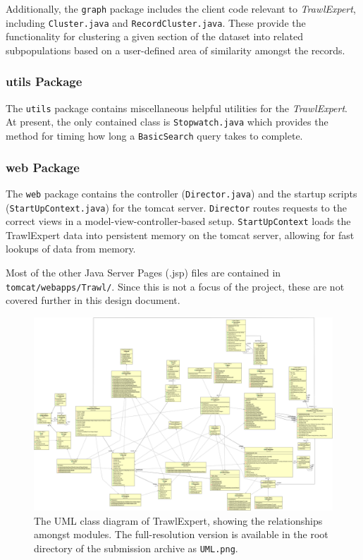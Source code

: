 \documentclass{article}
\begin{document}
Additionally, the \texttt{graph} package includes the client code relevant to \textit{TrawlExpert}, including \texttt{Cluster.java} and \texttt{RecordCluster.java}. These provide the functionality for clustering a given section of the dataset into related subpopulations based on a user-defined area of similarity amongst the records.

\subsubsection{utils Package}
The \texttt{utils} package contains miscellaneous helpful utilities for the \textit{TrawlExpert}. At present, the only contained class is \texttt{Stopwatch.java} which provides the method for timing how long a \texttt{BasicSearch} query takes to complete.

\subsubsection{web Package}
The \texttt{web} package contains the controller (\texttt{Director.java}) and the startup scripts (\texttt{StartUpContext.java}) for the tomcat server. \texttt{Director} routes requests to the correct views in a model-view-controller-based setup. \texttt{StartUpContext} loads the TrawlExpert data into persistent memory on the tomcat server, allowing for fast lookups of data from memory. 

Most of the other Java Server Pages (.jsp) files are contained in \texttt{tomcat/webapps/Trawl/}. Since this is not a focus of the project, these are not covered further in this design document.

\begin{figure}
\centering
\includegraphics[angle=90,width=14cm]{../UML.png}
\caption{The UML class diagram of TrawlExpert, showing the relationships amongst modules. The full-resolution version is available in the root directory of the submission archive as \texttt{UML.png}.}
\label{fig:UML}
\end{figure}
\end{document}
